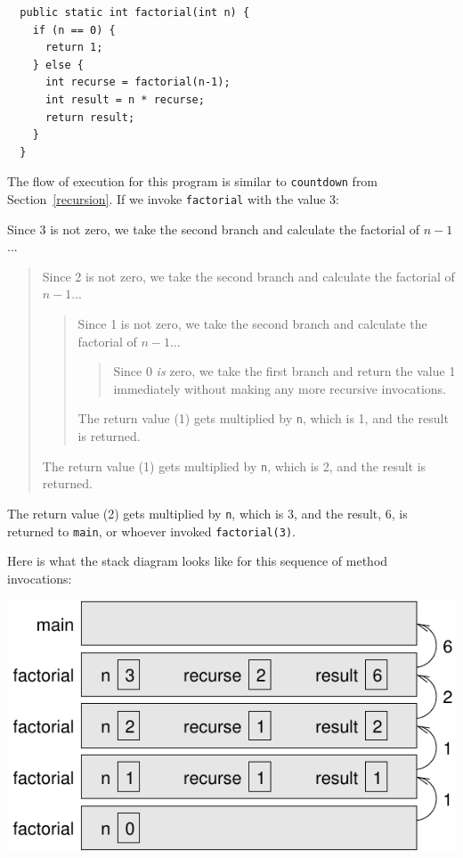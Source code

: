 \begin{lstlisting}
  public static int factorial(int n) {
    if (n == 0) {
      return 1;
    } else {
      int recurse = factorial(n-1);
      int result = n * recurse;
      return result;
    }
  }
\end{lstlisting}
%
The flow of execution for this program is similar to {\tt countdown}
from Section~\ref{recursion}.
If we invoke {\tt factorial} with the value 3:

Since 3 is not zero, we take the second branch and calculate
the factorial of $n-1$...

\begin{quote}
Since 2 is not zero, we take the second branch and calculate
the factorial of $n-1$...

\begin{quote}
Since 1 is not zero, we take the second branch and calculate
the factorial of $n-1$...

\begin{quote}
Since 0 {\em is} zero, we take the first branch and return
the value 1 immediately without making any more recursive
invocations.

\end{quote}

The return value (1) gets multiplied by {\tt n}, which is 1,
and the result is returned.

\end{quote}

The return value (1) gets multiplied by {\tt n}, which is 2,
and the result is returned.

\end{quote}

\noindent The return value (2) gets multiplied by {\tt n}, which is 3,
and the result, 6, is returned to {\tt main}, or whoever
invoked {\tt factorial(3)}.


Here is what the stack diagram looks like for this sequence of
method invocations:

\includegraphics{figs/stack3.pdf}

